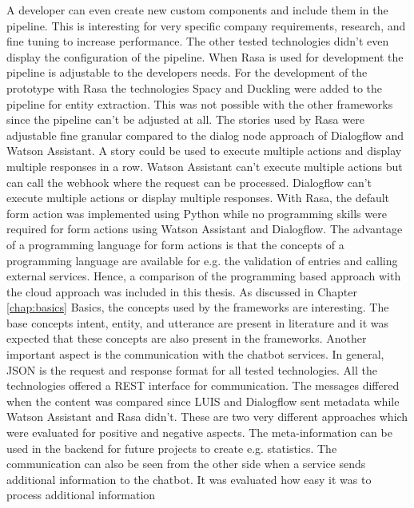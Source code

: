 A developer can even create new custom components and include them in the 
pipeline. 
This is interesting for very specific company requirements, research, and fine 
tuning to increase performance.
The other tested technologies didn't even display the configuration of the pipeline.
When Rasa is used for development the pipeline is adjustable to the 
developers needs.
For the development of the prototype with Rasa the technologies Spacy and 
Duckling were added to the pipeline for entity extraction.
This was not possible with the other frameworks since the pipeline can't 
be adjusted at all.
The stories used by Rasa were adjustable fine granular compared to the dialog
node approach of Dialogflow and Watson Assistant.
A story could be used to execute multiple actions and display multiple responses in a
row.
Watson Assistant can't execute multiple actions but can call the webhook where 
the request can be processed.
Dialogflow can't execute multiple actions or display multiple responses. 
With Rasa, the default form action was implemented using Python while no 
programming skills were required for form actions using Watson Assistant
and Dialogflow.
The advantage of a programming language for form actions is that the concepts of a programming 
language are available for e.g. the validation of entries and calling external services.
Hence, a comparison of the programming based approach with the cloud approach was 
included in this thesis.
As discussed in Chapter \ref{chap:basics} Basics, the concepts used by the 
frameworks are interesting.
The base concepts intent, entity, and utterance are present in literature and 
it was expected that these concepts are also present in the frameworks.
Another important aspect is the communication with the chatbot services.
In general, JSON is the request and response format for all tested technologies.
All the technologies offered a REST interface for communication.
The messages differed when the content was compared since 
LUIS and Dialogflow sent metadata while Watson Assistant and Rasa didn't.
These are two very different approaches which were evaluated for 
positive and negative aspects.
The meta-information can be used in the backend for future projects to 
create e.g. statistics.
The communication can also be seen from the other side when a service sends 
additional information to the chatbot.
It was evaluated how easy it was to process additional information

